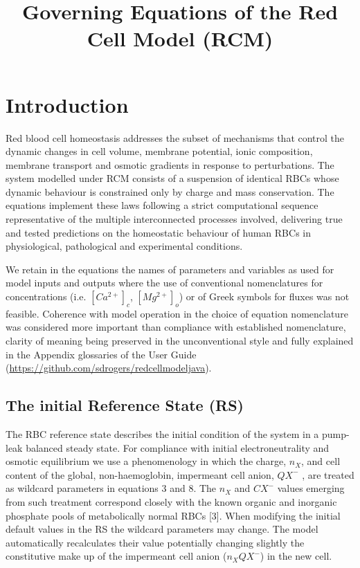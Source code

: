 \documentclass[a4paper]{article}
\title{Governing Equations of the Red Cell Model (RCM)}
\date{}
\newcommand{\cell}[1]{C#1}
\newcommand{\nX}{n_{X}}
\newcommand{\CXm}{\cell{X^{-}}}
\newcommand{\QXm}{QX^{-}}
\begin{document}
\maketitle

\section{Introduction}\label{introduction}

Red blood cell homeostasis addresses the subset of mechanisms that
control the dynamic changes in cell volume, membrane potential, ionic
composition, membrane transport and osmotic gradients in response to
perturbations. The system modelled under RCM consists of a suspension of identical
RBCs whose dynamic behaviour is constrained only by charge and mass
conservation. The equations implement these laws following a strict
computational sequence representative of the multiple interconnected
processes involved, delivering true and tested predictions on the
homeostatic behaviour of human RBCs in physiological, pathological and
experimental conditions.

We retain in the equations the names of parameters and variables as used for model inputs and outputs where the use of conventional nomenclatures for concentrations (i.e. $[Ca^{2+}]_c$, $[Mg^{2+}]_o$) or of Greek symbols for fluxes was not feasible.  Coherence with model operation in the choice of equation nomenclature was considered more important than compliance with established nomenclature, clarity of meaning being preserved in the unconventional style and fully explained in the Appendix glossaries of the User Guide (\url{https://github.com/sdrogers/redcellmodeljava}).


\subsection{The initial Reference State (RS)}

The RBC reference state describes the initial condition of the system in
a pump-leak balanced steady state. For compliance with initial
electroneutrality and osmotic equilibrium we use a phenomenology in
which the charge, $\nX$, and cell content of the global, non-haemoglobin,
impermeant cell anion, $\QXm$ , are treated as wildcard parameters in
equations 3 and 8. The $\nX$ and $\CXm$ values emerging from such treatment
correspond closely with the known organic and inorganic phosphate pools
of metabolically normal RBCs {[}3{]}. When modifying the initial default
values in the RS the wildcard parameters may change. The model
automatically recalculates their value potentially changing slightly the
constitutive make up of the impermeant cell anion ($\nX  \QXm$) in
the new cell.
\end{document}
